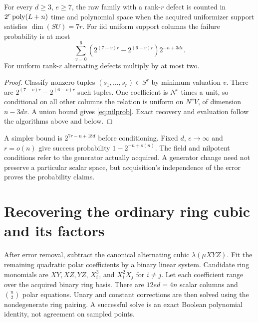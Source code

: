 \documentclass[11pt]{article}
\theoremstyle{remark}\newtheorem{remark}[theorem]{Remark}
\begin{document}
\begin{corollary}
For every $d\ge3$, $e\ge7$, the raw family with a rank-$r$ defect is counted
in $2^r\operatorname{poly}(L+n)$ time and polynomial space when the acquired uniformizer
support satisfies $\dim(SU)=7r$. For iid uniform support columns the failure
probability is at most
\begin{equation}\label{eq:nilprob}
 \sum_{v=0}^6
 \left(2^{(7-v)r}-2^{(6-v)r}\right)2^{-n+3dv}.
\end{equation}
For uniform rank-$r$ alternating defects multiply by at most two.
\end{corollary}
\begin{proof}
Classify nonzero tuples $(s_1,\ldots,s_r)\in S^r$ by minimum valuation $v$.
There are $2^{(7-v)r}-2^{(6-v)r}$ such tuples.
One coefficient is $N^v$ times a unit, so conditional on all other columns
the relation is uniform on $N^vV$, of dimension $n-3dv$.
A union bound gives \eqref{eq:nilprob}. Exact recovery and evaluation
follow the algorithms above and below.
\end{proof}
A simpler bound is $2^{7r-n+18d}$ before conditioning. Fixed $d$,
$e\to\infty$ and $r=o(n)$ give success probability $1-2^{-n+o(n)}$.
The field and nilpotent conditions refer to the generator actually acquired.
A generator change need not preserve a particular scalar space, but
acquisition's independence of the error proves the probability claims.

\section{Recovering the ordinary ring cubic and its factors}
After error removal, subtract the canonical alternating cubic
$\lambda(\mu XYZ)$. Fit the remaining quadratic polar coefficients by a
binary linear system. Candidate ring monomials are $XY,XZ,YZ$,
$X_i^3$, and $X_i^2X_j$ for $i\ne j$. Let each coefficient range over
the acquired binary ring basis. There are $12ed=4n$ scalar columns and
$\binom n2$ polar equations. Unary and constant corrections are then solved
using the nondegenerate ring pairing. A successful solve is an exact
Boolean polynomial identity, not agreement on sampled points.
\end{document}
